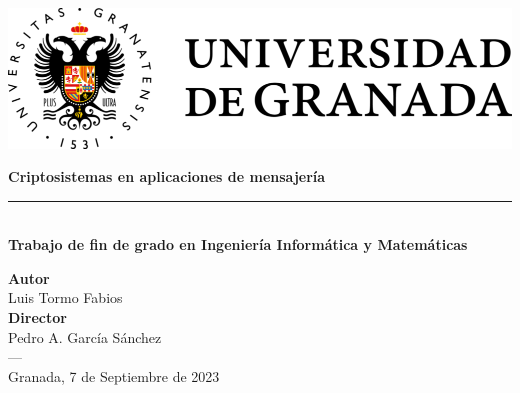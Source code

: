 \begin{titlepage}
 
 
\setlength{\centeroffset}{-0.5\oddsidemargin}
\addtolength{\centeroffset}{0.5\evensidemargin}
\thispagestyle{empty}

\noindent\hspace*{\centeroffset}\begin{minipage}{\textwidth}

\centering

 \vspace{3.3cm}

\includegraphics{imagenes/logo.png} 
 \vspace{0.5cm}


{\Huge\bfseries Criptosistemas en aplicaciones de mensajería\\
}
\noindent\rule[-1ex]{\textwidth}{3pt}\\[3.5ex]
{\large\bfseries Trabajo de fin de grado en Ingeniería Informática y Matemáticas\\[4cm]}
\end{minipage}

\vspace{2.5cm}
\noindent\hspace*{\centeroffset}\begin{minipage}{\textwidth}
\centering

\textbf{Autor}\\ {Luis Tormo Fabios}\\[2.5ex]
\textbf{Director}\\
Pedro A. García Sánchez\\
\textsc{---}\\
Granada, 7 de Septiembre de 2023
\end{minipage}


 
\end{titlepage}


